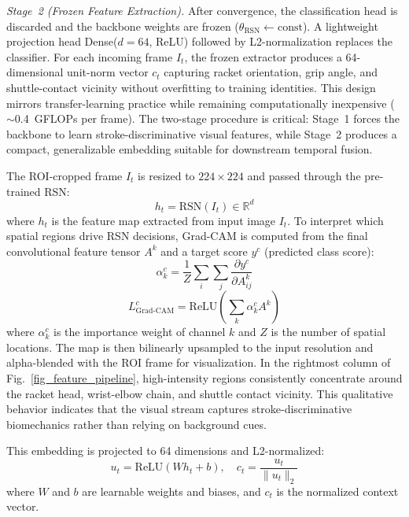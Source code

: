\documentclass[pdflatex,sn-mathphys-num]{sn-jnl}%
\theoremstyle{thmstyleone}%
\theoremstyle{thmstyletwo}%
\theoremstyle{thmstylethree}%
\begin{document}
\textit{Stage~2 (Frozen Feature Extraction).}
After convergence, the classification head is discarded and the backbone weights are frozen ($\theta_{\text{RSN}} \leftarrow \text{const}$). A lightweight projection head Dense($d{=}64$, ReLU) followed by L2-normalization replaces the classifier. For each incoming frame $I_t$, the frozen extractor produces a 64-dimensional unit-norm vector $c_t$ capturing racket orientation, grip angle, and shuttle-contact vicinity without overfitting to training identities. This design mirrors transfer-learning practice while remaining computationally inexpensive ($\sim$0.4~GFLOPs per frame). The two-stage procedure is critical: Stage~1 forces the backbone to learn stroke-discriminative visual features, while Stage~2 produces a compact, generalizable embedding suitable for downstream temporal fusion.

The ROI-cropped frame $I_t$ is resized to $224 \times 224$ and passed through the pre-trained RSN:
\begin{equation}
h_{t} = \text{RSN}(I_{t}) \in \mathbb{R}^{d}
\end{equation}
\noindent where $h_t$ is the feature map extracted from input image $I_t$. To interpret which spatial regions drive RSN decisions, Grad-CAM \cite{b31} is computed from the final convolutional feature tensor $A^{k}$ and a target score $y^{c}$ (predicted class score):
\begin{equation}
\alpha_k^{c} = \frac{1}{Z}\sum_i\sum_j \frac{\partial y^{c}}{\partial A_{ij}^{k}}
\end{equation}
\begin{equation}
L_{\text{Grad-CAM}}^{c} = \text{ReLU}\left(\sum_k \alpha_k^{c} A^{k}\right)
\end{equation}
\noindent where $\alpha_k^{c}$ is the importance weight of channel $k$ and $Z$ is the number of spatial locations. The map is then bilinearly upsampled to the input resolution and alpha-blended with the ROI frame for visualization. In the rightmost column of Fig.~\ref{fig_feature_pipeline}, high-intensity regions consistently concentrate around the racket head, wrist-elbow chain, and shuttle contact vicinity. This qualitative behavior indicates that the visual stream captures stroke-discriminative biomechanics rather than relying on background cues.

This embedding is projected to 64 dimensions and L2-normalized:
\begin{equation}
u_{t} = \text{ReLU}(W h_{t} + b), \quad c_{t} = \frac{u_{t}}{\|u_{t}\|_2}
\end{equation}
\noindent where $W$ and $b$ are learnable weights and biases, and $c_t$ is the normalized context vector.
\end{document}
